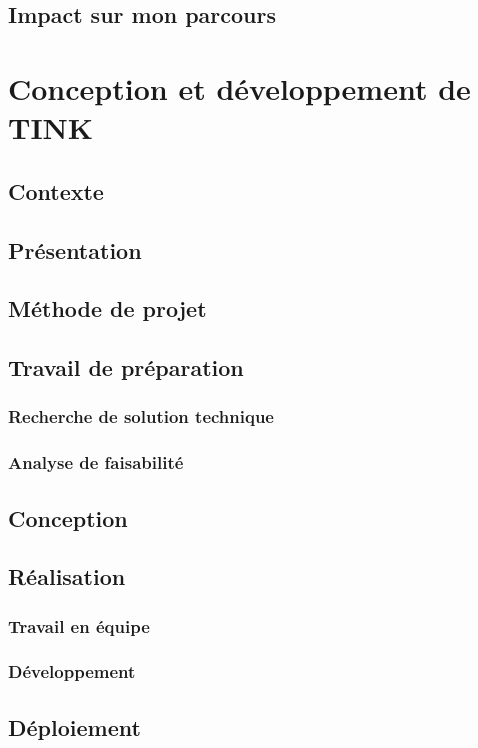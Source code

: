 \documentclass[12pt,a4paper]{report}
\begin{document}
\subsection{Impact sur mon parcours}
\paragraph*{}

\newpage
\section{Conception et développement de TINK}
\subsection{Contexte}
\subsection{Présentation}
\subsection{Méthode de projet}
\subsection{Travail de préparation}
\subsubsection{Recherche de solution technique}
\subsubsection{Analyse de faisabilité}
\subsection{Conception}
\subsection{Réalisation}
\subsubsection{Travail en équipe}
\subsubsection{Développement}
\subsection{Déploiement}
\end{document}

